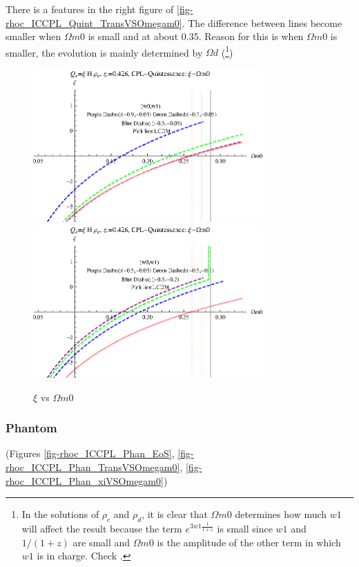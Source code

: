 \documentclass[12pt,a4paper]{article}
\begin{document}
There is a features in the right figure of \ref{fig-rhoc_ICCPL_Quint_TransVSOmegam0}. The difference between lines become smaller when $\Omega m0$ is small and at about 0.35. Reason for this is when $\Omega m0$ is smaller, the evolution is mainly determined by $\Omega d$ (\footnote{In the solutions of $\rho_c$ and $\rho_d$, it is clear that $\Omega m0$ determines how much $w1$ will affect the result because the term $e^{3w1\frac{1}{1+z}}$ is small since $w1$ and $1/(1+z)$ are small and $\Omega m0$ is the amplitude of the other term in which $w1$ is in charge. Check \CN .})


\begin{figure}
\centering
\includegraphics[width=250pt]{rhoc_ICCPL_Quint_xiVSOmegam01.eps}
\includegraphics[width=250pt]{rhoc_ICCPL_Quint_xiVSOmegam02.eps}
\caption{$\xi$ vs $\Omega m0$}\label{fig-rhoc_ICCPL_Quint_xiVSOmegam0}
\end{figure}




\subsubsection{Phantom}

(Figures \ref{fig-rhoc_ICCPL_Phan_EoS}, \ref{fig-rhoc_ICCPL_Phan_TransVSOmegam0}, \ref{fig-rhoc_ICCPL_Phan_xiVSOmegam0})
\end{document}
